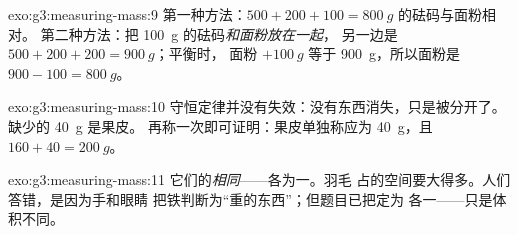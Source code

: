 \begin{solution}{exo:g3:measuring-mass:9}
第一种方法：$500 + 200 + 100 = \qty{800}{g}$ 的砝码与面粉相对。
第二种方法：把 \qty{100}{g} 的砝码\emph{和面粉放在一起}，
另一边是 $500 + 200 + 200 = \qty{900}{g}$；平衡时，
面粉 $+ \qty{100}{g}$ 等于 \qty{900}{g}，所以面粉是
$900 - 100 = \qty{800}{g}$。
\end{solution}

\begin{solution}{exo:g3:measuring-mass:10}
守恒定律并没有失效：没有东西消失，只是被分开了。
缺少的 \qty{40}{g} 是果皮。
再称一次即可证明：果皮单独称应为 \qty{40}{g}，且 $160 + 40 =
\qty{200}{g}$。
\end{solution}

\begin{solution}{exo:g3:measuring-mass:11}
它们的\emph{相同}——各为一。羽毛
占的空间要大得多。人们答错，是因为手和眼睛
把铁判断为“重的东西”；但题目已把定为
各一——只是体积不同。
\end{solution}
